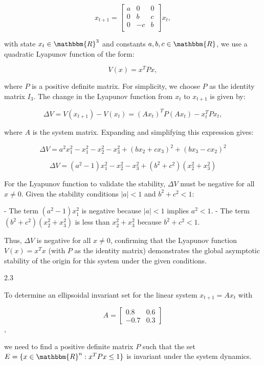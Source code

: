 \documentclass{article}
\begin{document}
\[
x_{t+1} =
\begin{bmatrix}
a & 0 & 0 \\
0 & b & c \\
0 & -c & b \\
\end{bmatrix} x_t,
\]

with state \(x_t \in \mathbbm{R}^3\) and constants \(a, b, c \in \mathbbm{R}\), we use a quadratic Lyapunov function of the form:

\[
V(x) = x^T P x,
\]

where \(P\) is a positive definite matrix. For simplicity, we choose \(P\) as the identity matrix \(I_3\). The change in the Lyapunov function from \(x_t\) to \(x_{t+1}\) is given by:

\[
\Delta V = V(x_{t+1}) - V(x_t) = (Ax_t)^T P (Ax_t) - x_t^T P x_t,
\]

where \(A\) is the system matrix. Expanding and simplifying this expression gives:

\[
\Delta V = a^2 x_1^2 - x_1^2 - x_2^2 - x_3^2 + (b x_2 + c x_3)^2 + (b x_3 - c x_2)^2
\]

\[
\Delta V = (a^2 - 1) x_1^2 - x_2^2 - x_3^2 + (b^2 + c^2)(x_2^2 + x_3^2)
\]

For the Lyapunov function to validate the stability, \(\Delta V\) must be negative for all \(x \neq 0\). Given the stability conditions \(|a| < 1\) and \(b^2 + c^2 < 1\):

- The term \((a^2 - 1) x_1^2\) is negative because \(|a| < 1\) implies \(a^2 < 1\).
- The term \((b^2 + c^2)(x_2^2 + x_3^2)\) is less than \(x_2^2 + x_3^2\) because \(b^2 + c^2 < 1\).

Thus, \(\Delta V\) is negative for all \(x \neq 0\), confirming that the Lyapunov function \(V(x) = x^T x\) (with \(P\) as the identity matrix) demonstrates the global asymptotic stability of the origin for this system under the given conditions.


2.3

To determine an ellipsoidal invariant set for the linear system \(x_{t+1} = Ax_t\) with

\[ A = \begin{bmatrix} 0.8 & 0.6 \\ -0.7 & 0.3 \end{bmatrix} \],

we need to find a positive definite matrix \(P\) such that the set \(E = \{x \in \mathbbm{R}^n : x^T P x \leq 1\}\) is invariant under the system dynamics.
\end{document}
